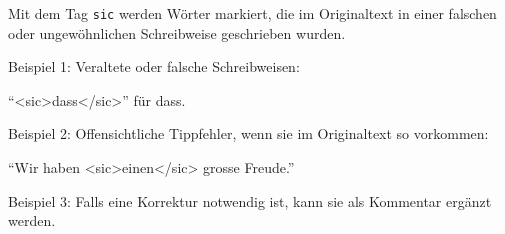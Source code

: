 \documentclass[12pt, a4paper, ngerman, bidi=default]{article}
\begin{document}
\begin{description}
    Mit dem Tag \texttt{sic} werden Wörter markiert, die im Originaltext in einer falschen oder ungewöhnlichen Schreibweise geschrieben wurden.

    \noindent{} Beispiel 1: Veraltete oder falsche Schreibweisen: 

    \colorbox{VeryLightGray}{\enquote{{<sic>dass</sic>}} für dass.}

     Beispiel 2: Offensichtliche Tippfehler, wenn sie im Originaltext so vorkommen: 

    \colorbox{VeryLightGray}{\enquote{Wir haben {<sic>einen</sic>} grosse Freude.}}

     Beispiel 3: Falls eine Korrektur notwendig ist, kann sie als Kommentar ergänzt werden. 

    \end{description}
    \endgroup
\end{document}
